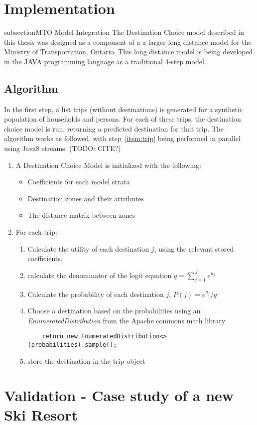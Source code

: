 \section{Implementation}
\label{section:implementation}
subsection{MTO Model Integration}
The Destination Choice model described in this thesis was designed as a component of a a larger long distance model for the Ministry of Transportation, Ontario. This long distance model is being developed in the JAVA programming language as a traditional 4-step model. 

\subsection{Algorithm}
In the first step, a list trips (without destinations) is generated for a synthetic population of households and persons. For each of these trips, the destination choice model is run, returning a predicted destination for that trip. The algorithm works as followed, with step~\ref{item:trip} being performed in parallel using Java8 streams. (TODO: CITE?)
\begin{enumerate}
\item A Destination Choice Model is initialized with the following:
	\begin{itemize}
	\item Coefficients for each model strata
	\item Destination zones and their attributes
	\item The distance matrix between zones
	\end{itemize}
\item \label{item:trip} For each trip:
	\begin{enumerate}
	\item Calculate the utility of each destination $j$, using the relevant stored coefficients.
	\item \label{item:denom} calculate the denominator of the logit equation $q = {\sum_{j=1}^{J} e^{u_j}}
	$
	\item Calculate the probability of each destination $j$, $P(j) = e^{u_j} / q $
	\item Choose a destination based on the probabilities using an \textit{EnumeratedDistribution} from the Apache commons math library 
	\begin{verbatim}
	return new EnumeratedDistribution<>(probabilities).sample();
	\end{verbatim}

	\item store the destination in the trip object
	\end{enumerate}
\end{enumerate}

\section{Validation - Case study of a new Ski Resort}